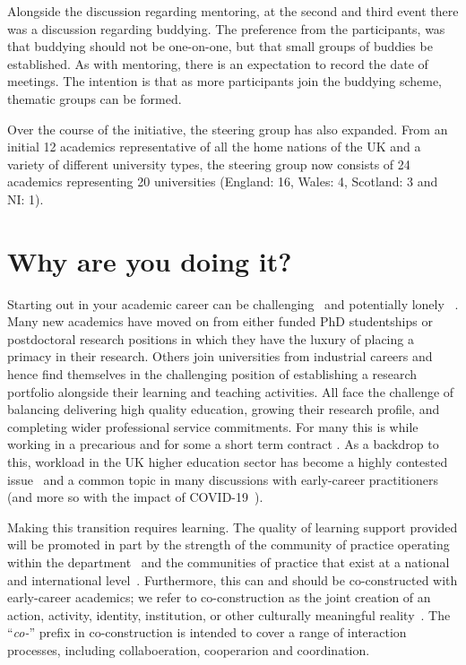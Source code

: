 \documentclass[sigconf]{acmart}
\begin{document}
Alongside the discussion regarding mentoring, at the second and third
event there was a discussion regarding buddying. The preference from
the participants, was that buddying should not be one-on-one, but that
small groups of buddies be established. As with mentoring, there is an
expectation to record the date of meetings. The intention is that as
more participants join the buddying scheme, thematic groups can be
formed.

Over the course of the initiative, the steering group has also
expanded. From an initial 12 academics representative of all the home
nations of the UK and a variety of different university types, the
steering group now consists of 24 academics representing 20
universities (England: 16, Wales: 4, Scotland: 3 and NI: 1).

\section{Why are you doing it?}
\label{sec:Why}
Starting out in your academic career can be
challenging~\cite{Thomas2015} and potentially lonely
~\cite{Foote2009}. Many new academics have moved on from either funded
PhD studentships or postdoctoral research positions in which they have
the luxury of placing a primacy in their research. Others join
universities from industrial careers and hence find themselves in the
challenging position of establishing a research portfolio alongside
their learning and teaching activities. All face the challenge of
balancing delivering high quality education, growing their research
profile, and completing wider professional service commitments. For
many this is while working in a precarious and for some a short term
contract \cite{UCU,JaffeS}. As a backdrop to this, workload in the UK
higher education sector has become a highly contested
issue~\cite{UCU2016} and a common topic in many discussions with
early-career practitioners (and more so with the impact of
COVID-19~\cite{crick-et-al:ukicer2020,watermeyer-et-al:he2020,CrickCovidUK}).

Making this transition requires learning. The quality of learning
support provided will be promoted in part by the strength of the
community of practice operating within the
department~\cite{Bolander2008} and the communities of practice that
exist at a national and international
level~\cite{Thomas2015}. Furthermore, this can and should be
co-constructed with early-career academics; we refer to 
co-construction as the joint creation of an action, activity,
identity, institution, or other culturally meaningful
reality~\cite{jacoby+ochs:1995}. The ``{\emph{co-}}'' prefix in
co-construction is intended to cover a range of interaction processes,
including collaboeration, cooperarion and coordination.
\end{document}
